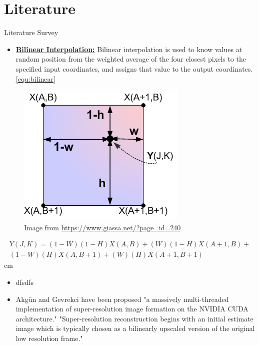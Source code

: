 \documentclass{beamer}
\begin{document}
\section{Literature}
	\begin{frame}{Literature Survey}
		\begin{itemize}
			\item \justifying \textbf{\underline{Bilinear Interpolation:}} Bilinear interpolation is used to know values at 	random position from the weighted average of the 	four closest pixels to the specified input coordinates, and assigns that value to the output coordinates.\cite{fadnavis2014image}  \eqref{equ:bilinear}
		\end{itemize}
	\end{frame}
	\begin{frame}
		\begin{figure}
			\includegraphics[scale=0.5]{./Figures/bilinear_interpolation.png}
			\caption{\label{fig:bilinear_img}Image from \url{https://www.giassa.net/?page_id=240}\cite{bilinear_img}}
		\end{figure}
		\begin{multline}\label{equ:bilinear}
			Y(J,K)=(1-W)(1-H)X(A,B)+(W)(1-H)X(A+1,B)+\\(1-W)(H)X(A,B+1)+(W)(H)X(A+1,B+1)
		\end{multline} cm
	\end{frame}
	\begin{frame}
		\begin{itemize}
			\item dfsdfs\cite{qingshuang2013parallel}
			\item\justifying Akgün and Gevrekci have been proposed "a massively multi-threaded implementation of super-resolution image formation on the NVIDIA CUDA architecture." \cite{akgun2013accelerating} "Super-resolution reconstruction begins with an initial estimate image which is typically chosen as a bilinearly upscaled version of the original low resolution frame."
		\end{itemize}
	\end{frame}
	
\end{document}
